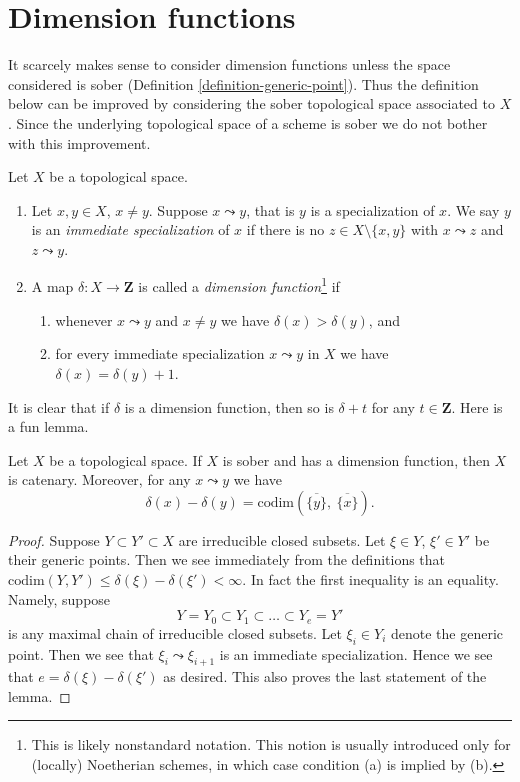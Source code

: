 \section{Dimension functions}
\label{section-dimension-function}

\noindent
It scarcely makes sense to consider dimension functions unless the space
considered is sober (Definition \ref{definition-generic-point}). Thus the
definition below can be improved by considering the sober topological space
associated to $X$. Since the underlying topological space of a scheme
is sober we do not bother with this improvement.

\begin{definition}
\label{definition-dimension-function}
Let $X$ be a topological space.
\begin{enumerate}
\item  Let $x, y \in X$, $x \not = y$. Suppose $x \leadsto y$, that
is $y$ is a specialization of $x$.
We say $y$ is an {\it immediate specialization}
of $x$ if there is no
$z \in X \setminus \{x, y\}$ with $x \leadsto z$ and $z \leadsto y$.
\item A map $\delta : X \to \mathbf{Z}$ is called a
{\it dimension function}\footnote{This is likely nonstandard
notation. This notion is usually introduced only for (locally) Noetherian
schemes, in which case condition (a) is implied by (b).} if
\begin{enumerate}
\item whenever $x \leadsto y$ and $x \not = y$
we have $\delta(x) > \delta(y)$, and
\item for every immediate specialization $x \leadsto y$ in $X$
we have $\delta(x) = \delta(y) + 1$.
\end{enumerate}
\end{enumerate}
\end{definition}

\noindent
It is clear that if $\delta$ is a dimension function, then so is
$\delta + t$ for any $t \in \mathbf{Z}$. Here is a fun lemma.

\begin{lemma}
\label{lemma-dimension-function-catenary}
Let $X$ be a topological space. If $X$ is sober and has a dimension
function, then $X$ is catenary. Moreover, for any $x \leadsto y$
we have
$$
\delta(x) - \delta(y) =
\text{codim}\left(\overline{\{y\}},\ \overline{\{x\}}\right).
$$
\end{lemma}

\begin{proof}
Suppose $Y \subset Y' \subset X$ are irreducible closed subsets.
Let $\xi \in Y$, $\xi' \in Y'$ be their generic points.
Then we see immediately from the definitions that
$\text{codim}(Y, Y') \leq \delta(\xi) - \delta(\xi') < \infty$.
In fact the first inequality is an equality. Namely, suppose
$$
Y = Y_0 \subset Y_1 \subset \ldots \subset Y_e = Y'
$$
is any maximal chain of irreducible closed subsets. Let
$\xi_i \in Y_i$ denote the generic point. Then we see that
$\xi_i \leadsto \xi_{i + 1}$ is an immediate specialization.
Hence we see that $e = \delta(\xi) - \delta(\xi')$ as desired.
This also proves the last statement of the lemma.
\end{proof}


